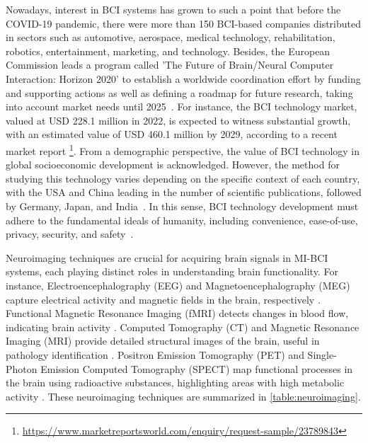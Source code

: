 Nowadays, interest in BCI systems has grown to such a point that before the COVID-19 pandemic, there were more than 150 BCI-based companies distributed in sectors such as automotive, aerospace, medical technology, rehabilitation, robotics, entertainment, marketing, and technology. Besides, the European Commission leads a program called 'The Future of Brain/Neural Computer Interaction: Horizon 2020' to establish a worldwide coordination effort by funding and supporting actions as well as defining a roadmap for future research, taking into account market needs until 2025~\cite{brunner2015bnci}. For instance, the BCI technology market, valued at USD 228.1 million in 2022, is expected to witness substantial growth, with an estimated value of USD 460.1 million by 2029, according to a recent market report \footnote{\url{https://www.marketreportsworld.com/enquiry/request-sample/23789843}}. From a demographic perspective, the value of BCI technology in global socioeconomic development is acknowledged. However, the method for studying this technology varies depending on the specific context of each country, with the USA and China leading in the number of scientific publications, followed by Germany, Japan, and India~\cite{maiseli2023brain}. In this sense, BCI technology development must adhere to the fundamental ideals of humanity, including convenience, ease-of-use, privacy, security, and safety~\cite{willett2021high, matemba2020technology}. 

Neuroimaging techniques are crucial for acquiring brain signals in MI-BCI systems, each playing distinct roles in understanding brain functionality. For instance, Electroencephalography (EEG) and Magnetoencephalography (MEG) capture electrical activity and magnetic fields in the brain, respectively \cite{altaheri2023deep,philip2022non}. Functional Magnetic Resonance Imaging (fMRI) detects changes in blood flow, indicating brain activity \cite{sorger2020real}. Computed Tomography (CT) and Magnetic Resonance Imaging (MRI) provide detailed structural images of the brain, useful in pathology identification \cite{singh2021comprehensive}. Positron Emission Tomography (PET) and Single-Photon Emission Computed Tomography (SPECT) map functional processes in the brain using radioactive substances, highlighting areas with high metabolic activity \cite{veena2020review}. These neuroimaging techniques are summarized in \cref{table:neuroimaging}.


